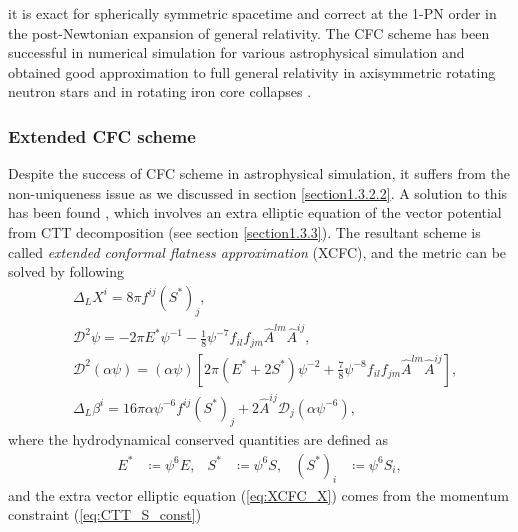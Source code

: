 it is exact for spherically symmetric spacetime \cite{cordero2011maximal} and
correct at the 1-PN order in the post-Newtonian expansion of general relativity.
The CFC scheme has been successful in numerical simulation for various astrophysical simulation
\cite{dimmelmeier2002relativistic,oechslin2002conformally,saijo2004collapse,bauswein2012equation,bauswein2013systematics,bauswein2014revealing,muller2015dynamics,dimmelmeier2006non} 
and obtained good approximation to full general relativity in axisymmetric rotating neutron stars 
\cite{shibata2004gravitational,dimmelmeier2002relativistic,dimmelmeier2006non,cook1996testing}
and in rotating iron core collapses \cite{ott2007rotating}.

\subsubsection{Extended CFC scheme}
\label{section_XCFC}
Despite the success of CFC scheme in astrophysical simulation,
it suffers from the non-uniqueness issue as we discussed in section \ref{section1.3.2.2}.
A solution to this has been found \cite{cordero2009improved,saijo2004collapse,shibata2006merger},
which involves an extra elliptic equation of the vector potential from CTT decomposition (see section \ref{section1.3.3}).
The resultant scheme is called \textit{extended conformal flatness approximation} (XCFC),
and the metric can be solved by following
\begin{align}
    & \Delta_L X^i = 8\pi f^{ij} \left(S^{*}\right)_j, \label{eq:XCFC_X}\\
    & \mathcal{D}^2 \psi = - 2\pi E^{*} \psi^{-1} - \frac{1}{8} \psi^{-7}f_{il}f_{jm} \hat{A}^{lm} \hat{A}^{ij}, \label{eq:XCFC_psi}\\
    & \mathcal{D}^2 \left(\alpha \psi \right) = \left( \alpha \psi \right) \left[ 2\pi \left( E^{*} + 2 S^{*} \right) \psi^{-2}
    + \frac{7}{8} \psi^{-8} f_{il}f_{jm} \hat{A}^{lm} \hat{A}^{ij} \right], \label{eq:XCFC_alp}\\
    & \Delta_L \beta^i = 16 \pi \alpha \psi^{-6} f^{ij} \left(S^{*}\right)_{j} + 2 \hat{A}^{ij} \mathcal{D}_j \left(\alpha \psi^{-6} \right), \label{eq:XCFC_beta}
\end{align}
where the hydrodynamical conserved quantities are defined as
\begin{align}
    E^* &\coloneqq \psi^6 E, & S^* & \coloneqq \psi^6 S, & \left(S^*\right)_i &\coloneqq \psi^6 S_i,
\end{align}
and the extra vector elliptic equation (\ref{eq:XCFC_X}) comes from the momentum constraint (\cref{eq:CTT_S_const}) 
